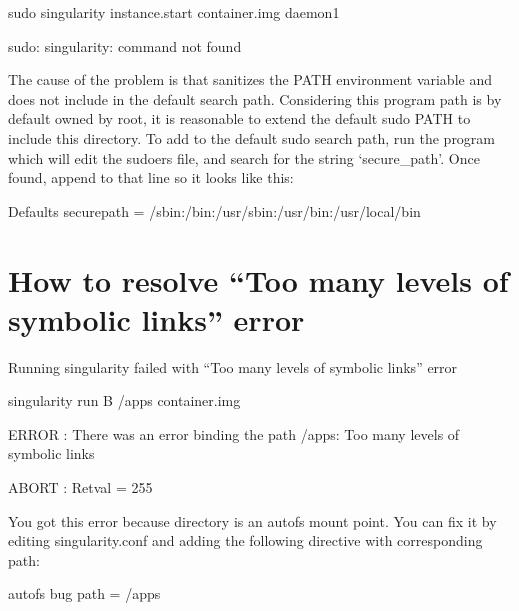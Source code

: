 \documentclass[letterpaper,10pt,english]{sphinxmanual}
\begin{document}
%
\begin{sphinxVerbatim}[commandchars=\\\{\}]
\PYGZdl{} sudo singularity instance.start container.img daemon1

sudo: singularity: command not found
\end{sphinxVerbatim}

The cause of the problem is that  sanitizes the PATH environment
variable and does not include  in the default search
path. Considering this program path is by default owned by root, it is
reasonable to extend the default sudo PATH to include this directory.
To add  to the default sudo search path, run the program
 which will edit the sudoers file, and search for the string
‘secure\_path’. Once found, append  to that line so it
looks like this:

%
\begin{sphinxVerbatim}[commandchars=\\\{\}]
Defaults    secure\PYGZus{}path = /sbin:/bin:/usr/sbin:/usr/bin:/usr/local/bin
\end{sphinxVerbatim}


\section{How to resolve “Too many levels of symbolic links” error}
\label{\detokenize{troubleshooting:how-to-resolve-too-many-levels-of-symbolic-links-error}}
Running singularity failed with “Too many levels of symbolic links”
error

%
\begin{sphinxVerbatim}[commandchars=\\\{\}]
\PYGZdl{} singularity run \PYGZhy{}B /apps container.img

ERROR : There was an error binding the path /apps: Too many levels of symbolic links

ABORT : Retval = 255
\end{sphinxVerbatim}

You got this error because  directory is an autofs mount point. You
can fix it by editing singularity.conf and adding the following
directive with corresponding path:

%
\begin{sphinxVerbatim}[commandchars=\\\{\}]
autofs bug path = /apps
\end{sphinxVerbatim}
\end{document}
